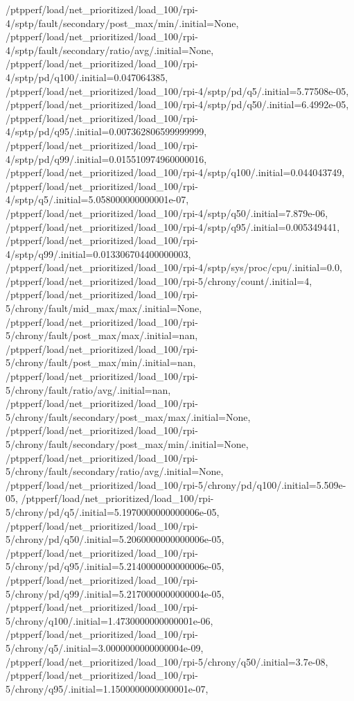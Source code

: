 {    /ptpperf/load/net_prioritized/load_100/rpi-4/sptp/fault/secondary/post_max/min/.initial=None,
    /ptpperf/load/net_prioritized/load_100/rpi-4/sptp/fault/secondary/ratio/avg/.initial=None,
    /ptpperf/load/net_prioritized/load_100/rpi-4/sptp/pd/q100/.initial=0.047064385,
    /ptpperf/load/net_prioritized/load_100/rpi-4/sptp/pd/q5/.initial=5.77508e-05,
    /ptpperf/load/net_prioritized/load_100/rpi-4/sptp/pd/q50/.initial=6.4992e-05,
    /ptpperf/load/net_prioritized/load_100/rpi-4/sptp/pd/q95/.initial=0.007362806599999999,
    /ptpperf/load/net_prioritized/load_100/rpi-4/sptp/pd/q99/.initial=0.015510974960000016,
    /ptpperf/load/net_prioritized/load_100/rpi-4/sptp/q100/.initial=0.044043749,
    /ptpperf/load/net_prioritized/load_100/rpi-4/sptp/q5/.initial=5.058000000000001e-07,
    /ptpperf/load/net_prioritized/load_100/rpi-4/sptp/q50/.initial=7.879e-06,
    /ptpperf/load/net_prioritized/load_100/rpi-4/sptp/q95/.initial=0.005349441,
    /ptpperf/load/net_prioritized/load_100/rpi-4/sptp/q99/.initial=0.013306704400000003,
    /ptpperf/load/net_prioritized/load_100/rpi-4/sptp/sys/proc/cpu/.initial=0.0,
    /ptpperf/load/net_prioritized/load_100/rpi-5/chrony/count/.initial=4,
    /ptpperf/load/net_prioritized/load_100/rpi-5/chrony/fault/mid_max/max/.initial=None,
    /ptpperf/load/net_prioritized/load_100/rpi-5/chrony/fault/post_max/max/.initial=nan,
    /ptpperf/load/net_prioritized/load_100/rpi-5/chrony/fault/post_max/min/.initial=nan,
    /ptpperf/load/net_prioritized/load_100/rpi-5/chrony/fault/ratio/avg/.initial=nan,
    /ptpperf/load/net_prioritized/load_100/rpi-5/chrony/fault/secondary/post_max/max/.initial=None,
    /ptpperf/load/net_prioritized/load_100/rpi-5/chrony/fault/secondary/post_max/min/.initial=None,
    /ptpperf/load/net_prioritized/load_100/rpi-5/chrony/fault/secondary/ratio/avg/.initial=None,
    /ptpperf/load/net_prioritized/load_100/rpi-5/chrony/pd/q100/.initial=5.509e-05,
    /ptpperf/load/net_prioritized/load_100/rpi-5/chrony/pd/q5/.initial=5.1970000000000006e-05,
    /ptpperf/load/net_prioritized/load_100/rpi-5/chrony/pd/q50/.initial=5.2060000000000006e-05,
    /ptpperf/load/net_prioritized/load_100/rpi-5/chrony/pd/q95/.initial=5.2140000000000006e-05,
    /ptpperf/load/net_prioritized/load_100/rpi-5/chrony/pd/q99/.initial=5.2170000000000004e-05,
    /ptpperf/load/net_prioritized/load_100/rpi-5/chrony/q100/.initial=1.4730000000000001e-06,
    /ptpperf/load/net_prioritized/load_100/rpi-5/chrony/q5/.initial=3.0000000000000004e-09,
    /ptpperf/load/net_prioritized/load_100/rpi-5/chrony/q50/.initial=3.7e-08,
    /ptpperf/load/net_prioritized/load_100/rpi-5/chrony/q95/.initial=1.1500000000000001e-07,
}
